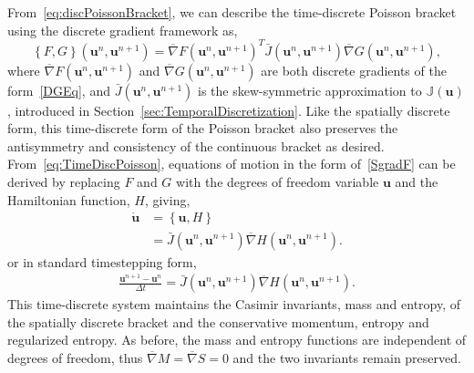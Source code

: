 \documentclass[preprint,12pt]{elsarticle}
\theoremstyle{definition}
\begin{document}
From~\eqref{eq:discPoissonBracket}, we can describe the time-discrete Poisson bracket using the discrete gradient framework as,
\begin{equation}
    \left\{ F,G \right\} \left(\boldsymbol{u}^n,\boldsymbol{u}^{n+1}\right) = \overline{\nabla} F \left(\boldsymbol{u}^n,\boldsymbol{u}^{n+1}\right)^T \bar{J}\left(\boldsymbol{u}^n,\boldsymbol{u}^{n+1}\right) \overline{\nabla} G \left(\boldsymbol{u}^n,\boldsymbol{u}^{n+1}\right),\label{eq:TimeDiscPoisson}
\end{equation}
where $\overline{\nabla} F \left(\boldsymbol{u}^n,\boldsymbol{u}^{n+1}\right)$ and $\overline{\nabla} G \left(\boldsymbol{u}^n,\boldsymbol{u}^{n+1}\right)$ are both discrete gradients of the form~\eqref{DGEq}, and $\bar{J}\left(\boldsymbol{u}^{n},\boldsymbol{u}^{n+1}\right)$ is the skew-symmetric approximation to $\mathbb{J}(\boldsymbol{u})$, introduced in Section~\ref{sec:TemporalDiscretization}. 
Like the spatially discrete form, this time-discrete form of the Poisson bracket also preserves the antisymmetry and consistency of the continuous bracket as desired. From~\eqref{eq:TimeDiscPoisson}, equations of motion in the form of~\eqref{SgradF} can be derived by replacing $F$ and $G$ with the degrees of freedom variable $\boldsymbol{u}$ and the Hamiltonian function, $H$, giving,
\begin{align}\label{eq:TimeDiscPoisson2}
  \dot{\boldsymbol{u}} &= \left\{\boldsymbol{u},H\right\} \nonumber\\
  &= \bar{J} \left(\boldsymbol{u}^n,\boldsymbol{u}^{n+1}\right) \overline{\nabla} H \left(\boldsymbol{u}^n,\boldsymbol{u}^{n+1}\right).
\end{align}
or in standard timestepping form,
\begin{align}\label{eq:DGPoisson}
  \frac{\boldsymbol{u}^{n+1} - \boldsymbol{u}^{n}}{\Delta t} = \bar{J} \left(\boldsymbol{u}^{n},\boldsymbol{u}^{n+1}\right) \overline{\nabla} H \left(\boldsymbol{u}^{n},\boldsymbol{u}^{n+1}\right).
\end{align}
This time-discrete system maintains the Casimir invariants, mass and entropy, of the spatially discrete bracket and the conservative momentum, entropy and regularized entropy. As before, the mass and entropy functions are independent of degrees of freedom, thus $\overline{\nabla} M = \overline{\nabla} S = 0$ and the two invariants remain preserved. 
\end{document}
